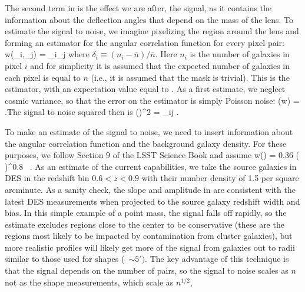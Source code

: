 The second term in  is the effect we are after, the signal,
as it contains the information about the deflection angles that
depend on the mass of the lens. To estimate the signal to noise, we
imagine pixelizing the region around the lens and forming an
estimator for the angular correlation function for every pixel pair:
\be \hat w(\vec\theta_i,\vec\theta_j) = \delta_i\delta_j \ee where
$\delta_i\equiv (n_i-\bar n)/\bar n$. Here $n_i$ is the number of
galaxies in pixel $i$ and for simplicity it is assumed that the
expected number of galaxies in each pixel is equal to $n$ (i.e., it
is assumed that the mask is trivial). This is the
\citet{1993ApJ...412...64L} estimator, with an expectation value equal to
.  As a first estimate, we neglect cosmic variance, so
that the error on the estimator is simply Poisson noise: (\hat w) =  .\ee The signal to noise squared
then is \be \left(\right)^2 = \sum_{ij}
 .\ee


To make an estimate of the signal to noise, we need to insert information about the angular correlation function and the background galaxy density.
For these purposes, we follow Section 9 of the LSST Science Book and assume
\be
w(\theta) = 0.36 \left(  \right)^{0.8} \, .
\ee
As an estimate of the current capabilities, we take the source galaxies in DES in the redshift bin $0.6<z<0.9$ with their number density of 1.5 per square arcminute. As a sanity check, the slope and amplitude in  are consistent with the latest DES measurements \citep{Elvin-Poole:2017xsf} when projected to the source galaxy redshift width and bias. 
In this simple example of a point mass, the signal falls off rapidly, so the estimate excludes regions close to the center to be conservative (these are the regions most likely to be impacted by contamination from cluster galaxies), but more realistic profiles will likely get more of the signal from galaxies out to radii similar to those used for shapes (~$\sim 5')$. The key advantage of this technique is that the signal depends on the number of pairs, so the signal to noise scales as $n$ not as the shape measurements, which scale as $n^{1/2}$, 


